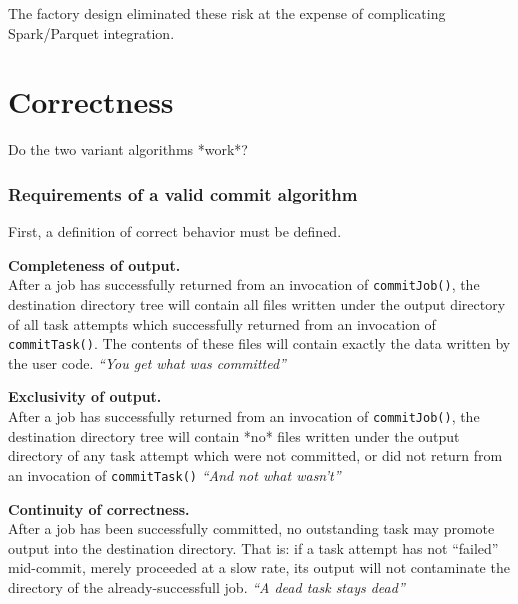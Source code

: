 \documentclass[conference]{IEEEtran}
\begin{document}
The factory design eliminated these risk at the expense of complicating
Spark/Parquet integration.




\section{Correctness}\label{sec:correctness}

Do the two variant algorithms *work*?


\subsubsection{Requirements of a valid commit algorithm}

First, a definition of correct behavior must be defined.

\begin{paragraph}
  \textbf{Completeness of output.}\\
  After a job has successfully returned from an invocation of \texttt{commitJob()},
  the destination directory tree will contain all files written under the output directory
  of all task attempts which successfully returned from an invocation of \texttt{commitTask()}.
  The contents of these files will contain exactly the data written by the user code.
  \emph{``You get what was committed''}
\end{paragraph}

\begin{paragraph}
  \textbf{Exclusivity of output.}\\
  After a job has successfully returned from an invocation of \texttt{commitJob()},
  the destination directory tree will contain *no* files written under the output directory
  of any task attempt which were not committed, or did not return from an invocation of \texttt{commitTask()}
  \emph{``And not what wasn't''}
\end{paragraph}

\begin{paragraph}
  \textbf{Continuity of correctness.}\\
  After a job has been successfully committed, no outstanding task may promote
  output into the destination directory.
  That is: if a task attempt has not ``failed'' mid-commit, merely proceeded at a slow rate,
  its output will not contaminate the directory of the already-successfull job.
  \emph{``A dead task stays dead''}
\end{paragraph}
\end{document}
